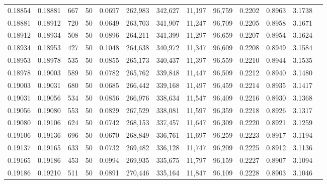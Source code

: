 \begin{tabular}{rrrrrrrrrrrrr}
0.18854 & 0.18881 &   667 &  50 &                                     0.0697 & 262,983 & 342,627 &  11,197 &  96,759 & 0.2202 & 0.8963 & 3.1738 \\
0.18881 & 0.18912 &   720 &  50 &                                     0.0649 & 263,703 & 341,907 &  11,247 &  96,709 & 0.2205 & 0.8958 & 3.1671 \\
0.18912 & 0.18934 &   508 &  50 &                                     0.0896 & 264,211 & 341,399 &  11,297 &  96,659 & 0.2207 & 0.8954 & 3.1624 \\
0.18934 & 0.18953 &   427 &  50 &                                     0.1048 & 264,638 & 340,972 &  11,347 &  96,609 & 0.2208 & 0.8949 & 3.1584 \\
0.18953 & 0.18978 &   535 &  50 &                                     0.0855 & 265,173 & 340,437 &  11,397 &  96,559 & 0.2210 & 0.8944 & 3.1535 \\
0.18978 & 0.19003 &   589 &  50 &                                     0.0782 & 265,762 & 339,848 &  11,447 &  96,509 & 0.2212 & 0.8940 & 3.1480 \\
0.19003 & 0.19031 &   680 &  50 &                                     0.0685 & 266,442 & 339,168 &  11,497 &  96,459 & 0.2214 & 0.8935 & 3.1417 \\
0.19031 & 0.19056 &   534 &  50 &                                     0.0856 & 266,976 & 338,634 &  11,547 &  96,409 & 0.2216 & 0.8930 & 3.1368 \\
0.19056 & 0.19080 &   553 &  50 &                                     0.0829 & 267,529 & 338,081 &  11,597 &  96,359 & 0.2218 & 0.8926 & 3.1317 \\
0.19080 & 0.19106 &   624 &  50 &                                     0.0742 & 268,153 & 337,457 &  11,647 &  96,309 & 0.2220 & 0.8921 & 3.1259 \\
0.19106 & 0.19136 &   696 &  50 &                                     0.0670 & 268,849 & 336,761 &  11,697 &  96,259 & 0.2223 & 0.8917 & 3.1194 \\
0.19137 & 0.19165 &   633 &  50 &                                     0.0732 & 269,482 & 336,128 &  11,747 &  96,209 & 0.2225 & 0.8912 & 3.1136 \\
0.19165 & 0.19186 &   453 &  50 &                                     0.0994 & 269,935 & 335,675 &  11,797 &  96,159 & 0.2227 & 0.8907 & 3.1094 \\
0.19186 & 0.19210 &   511 &  50 &                                     0.0891 & 270,446 & 335,164 &  11,847 &  96,109 & 0.2228 & 0.8903 & 3.1046 \\

\end{tabular}
